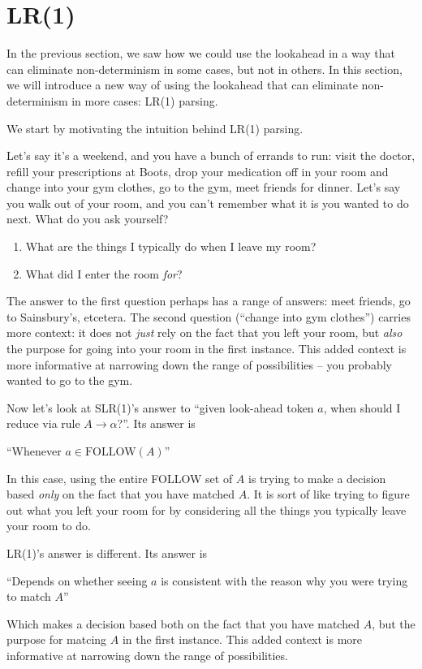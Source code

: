 \section{LR(1)}\label{section:lr1}
In the previous section, we saw how we could use the lookahead in a way that can eliminate non-determinism in some cases, but not in others. In this section, we will introduce a new way of using the lookahead that can eliminate non-determinism in more cases: LR(1) parsing.

We start by motivating the intuition behind LR(1) parsing. 

Let's say it's a weekend, and you have a bunch of errands to run: visit the doctor, refill your prescriptions at Boots, drop your medication off in your room and change into your gym clothes, go to the gym, meet friends for dinner. Let's say you walk out of your room, and you can't remember what it is you wanted to do next. What do you ask yourself?

\begin{enumerate}
    \item What are the things I typically do when I leave my room?
    \item What did I enter the room \textit{for}?
\end{enumerate}

The answer to the first question perhaps has a range of answers: meet friends, go to Sainsbury's, etcetera. The second question (``change into gym clothes'') carries more context: it does not \textit{just} rely on the fact that you left your room, but \textit{also} the purpose for going into your room in the first instance. This added context is more informative at narrowing down the range of possibilities -- you probably wanted to go to the gym. 

Now let's look at SLR(1)'s answer to ``given look-ahead token $a$, when should I reduce via rule $A \to \alpha$?''. Its answer is
\begin{center}
    ``Whenever $a \in \text{FOLLOW}(A)$''
\end{center}
In this case, using the entire FOLLOW set of $A$ is trying to make a decision based \textit{only} on the fact that you have matched $A$. It is sort of like trying to figure out what you left your room for by considering all the things you typically leave your room to do. 

LR(1)'s answer is different. Its answer is
\begin{center}
    ``Depends on whether seeing $a$ is consistent with the reason why you were trying to match $A$''
\end{center}
Which makes a decision based both on the fact that you have matched $A$, but the purpose for matcing $A$ in the first instance. This added context is more informative at narrowing down the range of possibilities. 

